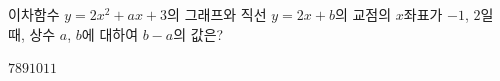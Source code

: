 이차함수 $y=2x^2+ax+3$의 그래프와 직선 $y=2x+b$의 교점의 $x$좌표가 $-1$, $2$일 때, 상수 $a$, $b$에 대하여 $b-a$의 값은?
\begin{choices32}{$7$}{$8$}{$9$}{$10$}{$11$}\end{choices32}
